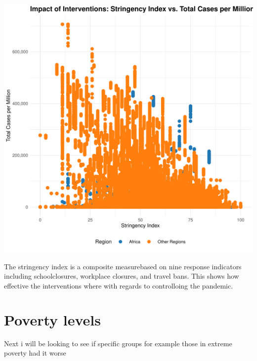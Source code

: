\documentclass[12pt,preprint, authoryear]{elsarticle}
\let\origfigure\figure
\let\endorigfigure\endfigure
\renewenvironment{figure}[1][2] {
    \expandafter\origfigure\expandafter[H]
} {
    \endorigfigure
}
\numberwithin{equation}{section}
\numberwithin{figure}{section}
\numberwithin{table}{section}
\begin{document}
\begin{figure}

{\centering \includegraphics{Q1_files/figure-latex/Figure8-1} 

}

\caption{ Ave cases vs vaccinated  \label{Figure8 }}\label{fig:Figure8}
\end{figure}

The stringency index is a composite measurebased on nine response
indicators including schoolclosures, workplace closures, and travel
bans. This shows how effective the interventions where with regards to
controlloing the pandemic.

\hypertarget{poverty-levels}{%
\section{Poverty levels}\label{poverty-levels}}

Next i will be looking to see if specific groups for example those in
extreme poverty had it worse

\begin{Shaded}
\begin{Highlighting}[]
\end{Highlighting}
\end{Shaded}
\end{document}
